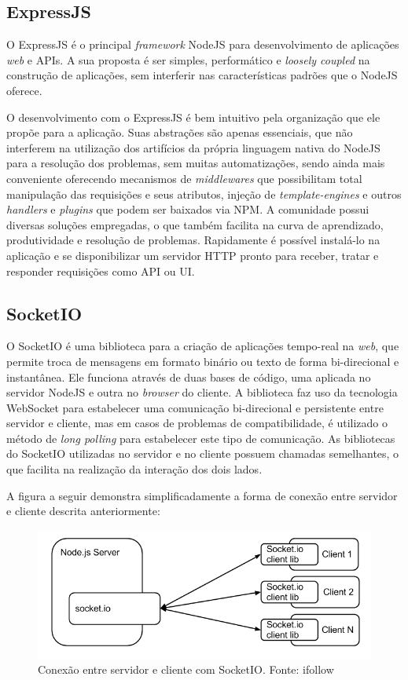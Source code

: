 \subsection{ExpressJS}
O ExpressJS \cite{expressjs} é o principal \textit{framework} NodeJS para desenvolvimento de aplicações \textit{web} e APIs. A sua proposta é ser simples, performático e \textit{loosely coupled} na construção de aplicações, sem interferir nas características padrões que o NodeJS oferece.

O desenvolvimento com o ExpressJS é bem intuitivo pela organização que ele propõe para a aplicação. Suas abstrações são apenas essenciais, que não interferem na utilização dos artifícios da própria linguagem nativa do NodeJS para a resolução dos problemas, sem muitas automatizações, sendo ainda mais conveniente oferecendo mecanismos de \textit{middlewares} que possibilitam total manipulação das requisições e seus atributos, injeção de \textit{template-engines} e outros \textit{handlers} e \textit{plugins} que podem ser baixados via NPM. A comunidade possui diversas soluções empregadas, o que também facilita na curva de aprendizado, produtividade e resolução de problemas. Rapidamente é possível instalá-lo na aplicação e se disponibilizar um servidor HTTP pronto para receber, tratar e responder requisições como API ou UI.

\subsection{SocketIO}
O SocketIO é uma biblioteca para a criação de aplicações tempo-real na \textit{web}, que permite troca de mensagens em formato binário ou texto de forma bi-direcional e instantânea. Ele funciona através de duas bases de código, uma aplicada no servidor NodeJS e outra no \textit{browser} do cliente. A biblioteca faz uso da tecnologia WebSocket para estabelecer uma comunicação bi-direcional e persistente entre servidor e cliente, mas em casos de problemas de compatibilidade, é utilizado o método de \textit{long polling} para estabelecer este tipo de comunicação. As bibliotecas do SocketIO utilizadas no servidor e no cliente possuem chamadas semelhantes, o que facilita na realização da interação dos dois lados.

A figura a seguir demonstra simplificadamente a forma de conexão entre servidor e cliente descrita anteriormente:

\begin{figure}[!htb]
	\centering
	\includegraphics[scale=0.67]{imagens/socketio.png}
	\caption{\small Conexão entre servidor e cliente com SocketIO. Fonte: ifollow \cite{img-socketio}}
	\label{fig:socketio}
\end{figure}

